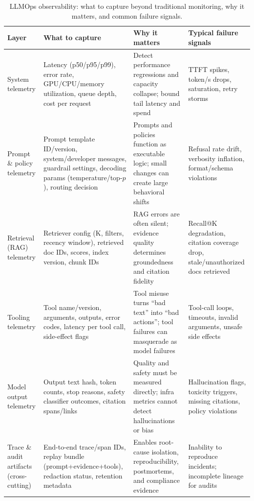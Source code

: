 \begin{table}[t]
\centering
\small
\caption{LLMOps observability: what to capture beyond traditional monitoring, why it matters, and common failure signals.}
\label{tab:ch01_llm_observability}
\setlength{\tabcolsep}{6pt}
\renewcommand{\arraystretch}{1.3}
\begin{tabularx}{\linewidth}{@{}>{\raggedright\arraybackslash}p{2.5cm}>{\raggedright\arraybackslash}X>{\raggedright\arraybackslash}X>{\raggedright\arraybackslash}X@{}}
\toprule
\rowcolor{gray!15}
\textbf{Layer} & \textbf{What to capture} & \textbf{Why it matters} & \textbf{Typical failure signals} \\
\midrule
System telemetry &
Latency (p50/p95/p99), error rate, GPU/CPU/memory utilization, queue depth, cost per request &
Detect performance regressions and capacity collapse; bound tail latency and spend &
TTFT spikes, token/s drops, saturation, retry storms \\
\addlinespace[0.5em]
Prompt \& policy telemetry &
Prompt template ID/version, system/developer messages, guardrail settings, decoding params (temperature/top-$p$), routing decision &
Prompts and policies function as executable logic; small changes can create large behavioral shifts &
Refusal rate drift, verbosity inflation, format/schema violations \\
\addlinespace[0.5em]
Retrieval (RAG) telemetry &
Retriever config (K, filters, recency window), retrieved doc IDs, scores, index version, chunk IDs &
RAG errors are often silent; evidence quality determines groundedness and citation fidelity &
Recall@K degradation, citation coverage drop, stale/unauthorized docs retrieved \\
\addlinespace[0.5em]
Tooling telemetry &
Tool name/version, arguments, outputs, error codes, latency per tool call, side-effect flags &
Tool misuse turns ``bad text'' into ``bad actions''; tool failures can masquerade as model failures &
Tool-call loops, timeouts, invalid arguments, unsafe side effects \\
\addlinespace[0.5em]
Model output telemetry &
Output text hash, token counts, stop reasons, safety classifier outcomes, citation spans/links &
Quality and safety must be measured directly; infra metrics cannot detect hallucinations or bias &
Hallucination flags, toxicity triggers, missing citations, policy violations \\
\addlinespace[0.5em]
Trace \& audit artifacts (cross-cutting) &
End-to-end trace/span IDs, replay bundle (prompt+evidence+tools), redaction status, retention metadata &
Enables root-cause isolation, reproducibility, postmortems, and compliance evidence &
Inability to reproduce incidents; incomplete lineage for audits \\
\bottomrule
\end{tabularx}
\end{table}

